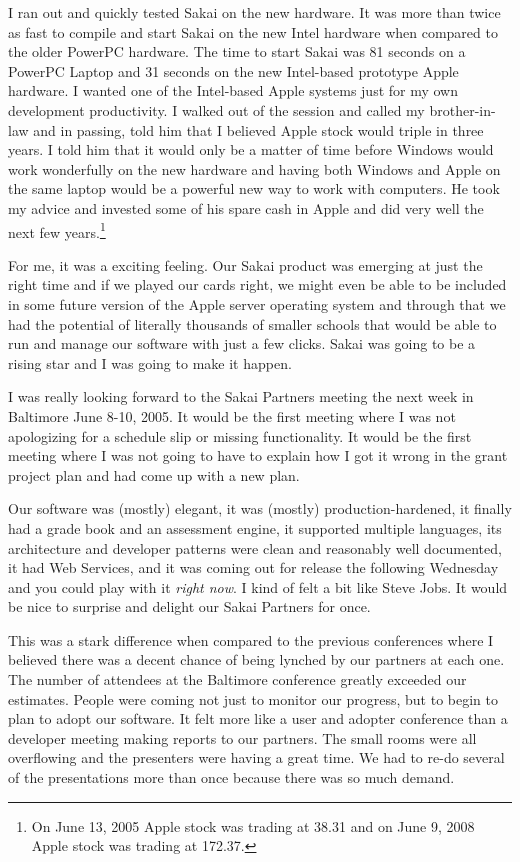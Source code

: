\documentclass[12pt]{book}
\begin{document}
I ran out and quickly tested Sakai on the new hardware.
It was more than twice as fast to compile and start Sakai
on the new Intel hardware when compared to the older
PowerPC hardware.
The time to start Sakai was 81 seconds on a PowerPC Laptop
and 31 seconds on the new Intel-based prototype Apple
hardware.  I wanted one of the Intel-based Apple systems
just for my own development productivity.
I walked out of the session and called my brother-in-law
and in passing, told him that I believed Apple stock would
triple in three years.
I told him that it would only be a matter of time
before Windows would work wonderfully on the new hardware
and having both Windows and Apple on the same laptop would
be a powerful new way to work with computers.  He took my
advice and invested some of his spare cash in Apple and
did very well the next few years.\footnote{On June 13, 2005 
Apple stock was trading at
38.31 and on June 9, 2008 Apple stock was trading at 172.37.}

For me, it was a exciting feeling.  Our Sakai product
was emerging at just the right time and if we played our cards
right, we might even be able to be included in some
future version of the Apple server operating system and through
that we had the potential of literally thousands of smaller
schools that would be able to run and manage our software
with just a few clicks.   Sakai was going to be a rising star
and I was going to make it happen.

I was really looking forward
to the Sakai Partners meeting the next week
in Baltimore June 8-10, 2005.  It would be the first meeting
where I was not apologizing for a schedule slip or missing
functionality.  It would be the first meeting where I was not
going to have to explain how I got it wrong in the grant
project plan and had come up with a new plan.

Our software was (mostly) elegant, it was (mostly)
production-hardened, it finally had a grade book and
an assessment engine, it supported multiple languages,
its architecture and developer patterns were clean and reasonably
well documented, it had Web Services, and it was coming
out for release the following Wednesday and you could
play with it \emph{right now}.  I kind of felt a bit like
Steve Jobs.  It would be nice to surprise and delight
our Sakai Partners for once.

This was a stark difference when compared to the previous
conferences where I believed there was a decent chance of being
lynched by our partners at each one.  The number of attendees
at the Baltimore conference greatly exceeded our estimates.
People were coming not just to
monitor our progress, but to begin to plan to adopt our
software.   It felt more like a user and adopter conference
than a developer meeting making reports to our partners.
The small rooms were all overflowing
and the presenters were having a great time.  We had to
re-do several of the presentations more than once because there
was so much demand.
\end{document}
